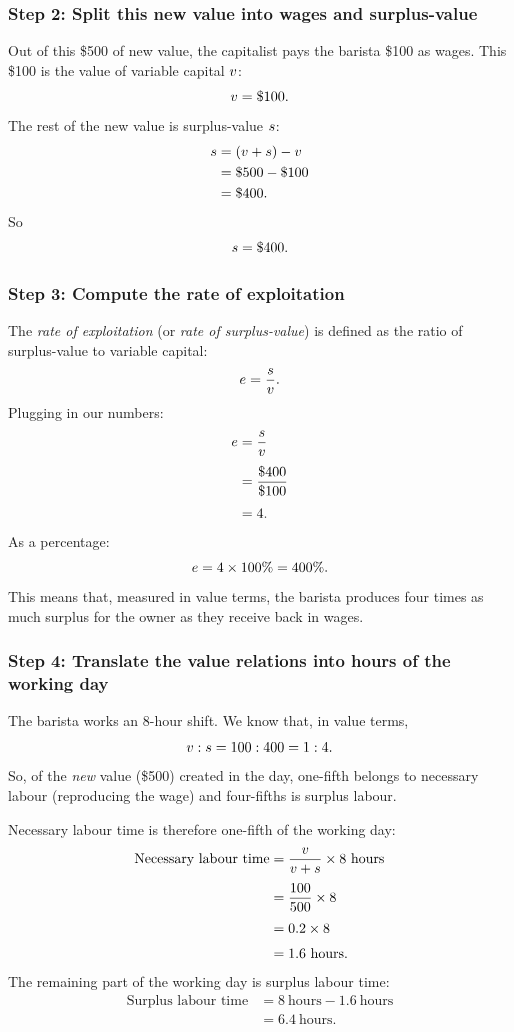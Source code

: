 \begin{example}
\subsubsection*{Step 2: Split this new value into wages and surplus-value}

Out of this \$500 of new value, the capitalist pays the barista \$100 as wages.
This \$100 is the value of variable capital $v$:
\[
  v = \$100.
\]
The rest of the new value is surplus-value $s$:
\begin{align*}
  s
    &= (v + s) - v\\
    &= \$500 - \$100\\
    &= \$400.
\end{align*}
So
\[
  s = \$400.
\]

\subsubsection*{Step 3: Compute the rate of exploitation}

The \emph{rate of exploitation} (or \emph{rate of surplus-value}) is defined as
the ratio of surplus-value to variable capital:
\[
  e = \frac{s}{v}.
\]
Plugging in our numbers:
\begin{align*}
  e
    &= \frac{s}{v}\\[0.3em]
    &= \frac{\$400}{\$100}\\[0.3em]
    &= 4.
\end{align*}
As a percentage:
\[
  e = 4 \times 100\% = 400\%.
\]
This means that, measured in value terms, the barista produces four times as
much surplus for the owner as they receive back in wages.

\subsubsection*{Step 4: Translate the value relations into hours of the working day}

The barista works an 8-hour shift.  We know that, in value terms,
\[
  v : s = 100 : 400 = 1 : 4.
\]
So, of the \emph{new} value (\$500) created in the day, one-fifth belongs to
necessary labour (reproducing the wage) and four-fifths is surplus labour.

Necessary labour time is therefore one-fifth of the working day:
\begin{align*}
  \text{Necessary labour time}
    &= \frac{v}{v + s} \times 8\ \text{hours}\\[0.3em]
    &= \frac{100}{500} \times 8\\[0.3em]
    &= 0.2 \times 8\\[0.3em]
    &= 1.6\ \text{hours}.
\end{align*}
The remaining part of the working day is surplus labour time:
\begin{align*}
  \text{Surplus labour time}
    &= 8\ \text{hours} - 1.6\ \text{hours}\\[0.3em]
    &= 6.4\ \text{hours}.
\end{align*}


\end{example}

